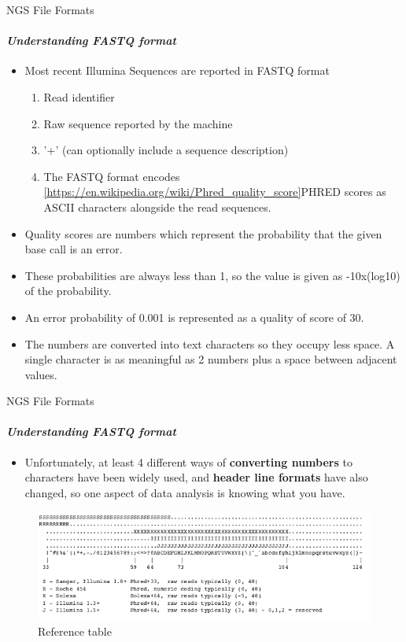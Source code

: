 \documentclass{if-beamer}
\begin{document}
\begin{frame}{NGS File Formats}
\framesubtitle{\emph{Understanding FASTQ format}}
\begin{itemize}
    \item Most recent Illumina Sequences are reported in FASTQ format
    \begin{enumerate}
        \item Read identifier
        \item Raw sequence reported by the machine
        \item '+' (can optionally include a sequence description)
        \item The FASTQ format encodes \cref{https://en.wikipedia.org/wiki/Phred_quality_score}{PHRED scores} as ASCII characters alongside the read sequences.
    \end{enumerate}
    \item Quality scores are numbers which represent the probability that the given base call is an error.
    \item These probabilities are always less than 1, so the value is given as -10x(log10) of the probability.
    \item An error probability of 0.001 is represented as a quality of score of 30.
    \item The numbers are converted into text characters so they occupy less space. A single character is as meaningful as 2 numbers plus a space between adjacent values. 
\end{itemize} 
\end{frame}
\begin{frame}{NGS File Formats}
\framesubtitle{\emph{Understanding FASTQ format}}
\begin{itemize}
    \item Unfortunately, at least 4 different ways of \textbf{converting numbers} to characters have been widely used, and \textbf{header line formats} have also changed, so one aspect of data analysis is knowing what you have.
\end{itemize} 
\begin{figure}
\centering
\includegraphics[scale=0.7]{ref_table_quality1.PNG}
\caption{Reference table}
\end{figure}
\end{frame}
\end{document}
